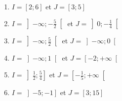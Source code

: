 \documentclass[
	landscape,
	twocolumn,
	classe=$2^{de}$,
	headerTitle=Activité\space Chapitre\space 2
]{exercice}
\newcommand{\intervalle}[4]{\left#1 #2;#3\right#4}
\begin{document}
{\begin{enumerate}
		      \begin{multicols}{2}
			      \begin{enumerate}
				      \item $I = \intervalle{[}{2}{6}{]}$ et $J = \intervalle{[}{3}{5}{]}$
				            \vspace{\itemSpacing}
				      \item $I =  \intervalle{]}{-∞}{-\frac{5}{2}}{[}$ et $J = \intervalle{]}{0}{-\frac{1}{4}}{[}$
				            \vspace{\itemSpacing}
				      \item $I =  \intervalle{]}{-∞}{\frac{5}{2}}{[}$ et $J = \intervalle{]}{-∞}{0}{[}$
				            \vspace{\itemSpacing}
				      \item $I =  \intervalle{]}{-∞}{1}{[}$ et $J = \intervalle{[}{-2}{+∞}{[}$
				            \vspace{\itemSpacing}
				      \item $I =  \intervalle{]}{\frac{1}{2}}{\frac{5}{4}}{]}$ et $J = \intervalle{[}{-\frac{1}{5}}{+∞}{[}$
				      \item $I =  \intervalle{]}{-5}{-1}{]}$ et $J = \intervalle{[}{3}{15}{]}$
			      \end{enumerate}
		      \end{multicols}
	\end{enumerate}
}

\Activite

\newpage
\Activite
\end{document}
